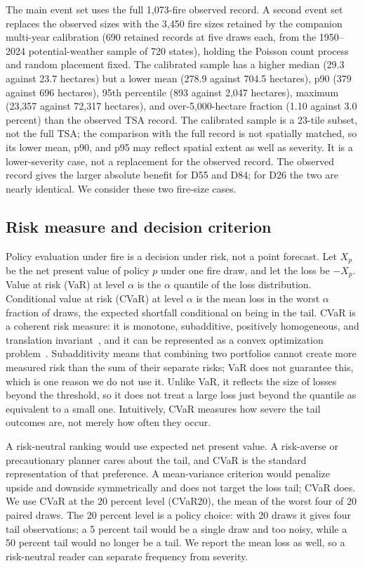 The main event set uses the full 1,073-fire observed record. A second event set replaces the observed
sizes with the 3,450 fire sizes retained by the companion multi-year calibration
\citep{ubc_fresh_fire_regime_repro_2026} (690 retained records at five draws each, from the
1950--2024 potential-weather sample of 720 states), holding the Poisson count process and random
placement fixed.
The calibrated sample has a higher median (29.3 against 23.7 hectares) but a lower mean (278.9
against 704.5 hectares), p90 (379 against 696 hectares), 95th percentile (893 against 2,047
hectares), maximum (23,357 against 72,317 hectares), and over-5,000-hectare fraction (1.10 against
3.0 percent) than the observed TSA record. The calibrated sample is a 23-tile subset, not the full
TSA; the comparison with the full record is not spatially matched, so its lower mean, p90, and p95
may reflect spatial extent as well as severity. It is a lower-severity case, not a replacement for
the observed record. The observed record gives the larger absolute benefit for D55 and D84; for D26 the two are nearly
identical. We consider these two fire-size cases.

\subsection{Risk measure and decision criterion}

Policy evaluation under fire is a decision under risk, not a point forecast. Let $X_p$ be the net
present value of policy $p$ under one fire draw, and let the loss be $-X_p$. Value at risk (VaR) at
level $\alpha$ is the $\alpha$ quantile of the loss distribution. Conditional value at risk (CVaR) at
level $\alpha$ is the mean loss in the worst $\alpha$ fraction of draws, the expected shortfall
conditional on being in the tail. CVaR is a coherent risk measure: it is monotone, subadditive,
positively homogeneous, and translation invariant~\citep{artzner_coherent_1999}, and it can be
represented as a convex optimization problem~\citep{rockafellar_optimization_2000}. Subadditivity
means that combining two portfolios cannot create more measured risk than the sum of their separate
risks; VaR does not guarantee this, which is one reason we do not use it. Unlike VaR, it reflects the
size of losses beyond the threshold, so it does not treat a large loss just beyond the quantile as
equivalent to a small one. Intuitively, CVaR measures how severe the tail outcomes are, not merely
how often they occur.

A risk-neutral ranking would use expected net present value. A risk-averse or precautionary planner
cares about the tail, and CVaR is the standard representation of that preference. A mean-variance
criterion would penalize upside and downside symmetrically and does not target the loss tail; CVaR
does. We use CVaR at the
20 percent level (CVaR20), the mean of the worst four of 20 paired draws. The 20 percent level is a
policy choice: with 20 draws it gives four tail observations; a 5 percent tail would be a single draw
and too noisy, while a 50 percent tail would no longer be a tail. We report the mean loss as well,
so a risk-neutral reader can separate frequency from severity.

